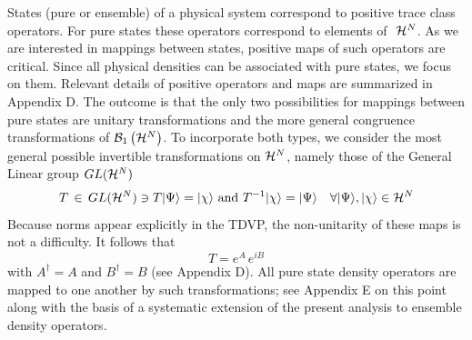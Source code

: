 States (pure or ensemble) of a physical system correspond to positive trace
class operators. For pure states these operators correspond to elements of $%
\ {\cal H}^{N}$. As we are interested in mappings between states, positive
maps of such operators are critical. Since all physical densities can be
associated with pure states, we focus on them. Relevant details of positive
operators and maps are summarized in Appendix D. The outcome is that the
only two possibilities for mappings between pure states are unitary
transformations and the more general congruence transformations\cite%
{congruence} of ${\cal B}_{1}\left( {\cal H}^{N}\right) $. To incorporate
both types, we consider the most general possible invertible transformations
on ${\cal H}^{N}$, namely those of the General Linear group $GL({\cal H}^{N})
$ 
\begin{equation}
T\,\in \,GL({\cal H}^{N})\ni T|\Psi \rangle =|\chi \rangle \text{ and }%
T^{-1}|\chi \rangle =|\Psi \rangle \quad \forall |\Psi \rangle ,|\chi
\rangle \in {\cal H}^{N}
\end{equation}
Because norms appear explicitly in the TDVP, the non-unitarity of these maps
is not a difficulty. It follows that 
\begin{equation}
T=e^{A}\,e^{iB}  \label{eAeiB}
\end{equation}
with $A^{\dagger }=A$ and $B^{\dagger }=B$ (see Appendix D). All pure state
density operators are mapped to one another by such transformations; see
Appendix E on this point along with the basis of a systematic extension of
the present analysis to ensemble density operators.

